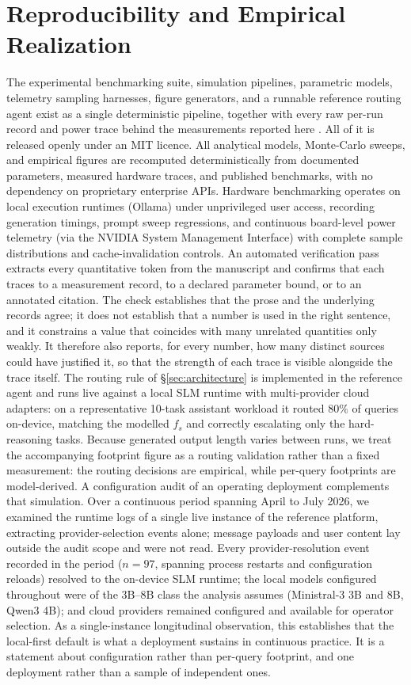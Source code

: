 \documentclass[conference]{IEEEtran}
\newcommand{\fs}{f_{s}}
\begin{document}
\section*{Reproducibility and Empirical Realization}
The experimental benchmarking suite, simulation pipelines, parametric models,
telemetry sampling harnesses, figure generators, and a runnable reference
routing agent exist as a single deterministic pipeline, together with every
raw per-run record and power trace behind the measurements reported here
\cite{autoyou2026measure}. All of it is released openly under an MIT
licence. All analytical models, Monte-Carlo sweeps,
and empirical figures are recomputed deterministically from documented
parameters, measured hardware traces, and published benchmarks, with no
dependency on proprietary enterprise APIs.
Hardware benchmarking operates on local execution runtimes (Ollama) under
unprivileged user access, recording generation timings, prompt sweep regressions,
and continuous board-level power telemetry (via the NVIDIA System Management
Interface) with complete sample distributions and cache-invalidation controls.
An automated verification pass extracts every quantitative token from the
manuscript and confirms that each traces to a measurement record, to a declared
parameter bound, or to an annotated citation. The check establishes that the
prose and the underlying records agree; it does not establish that a number is
used in the right sentence, and it constrains a value that coincides with many
unrelated quantities only weakly. It therefore also reports, for every number,
how many distinct sources could have justified it, so that the strength of each
trace is visible alongside the trace itself.
The routing rule of \S\ref{sec:architecture} is implemented in the
reference agent and runs live against a local SLM runtime with multi-provider
cloud adapters: on a representative 10-task assistant workload it routed $80\%$
of queries on-device, matching the modelled $\fs$ and correctly escalating only
the hard-reasoning tasks. Because generated output length varies between runs,
we treat the accompanying footprint figure as a routing validation rather than
a fixed measurement: the routing decisions are empirical, while per-query
footprints are model-derived.
A configuration audit of an operating deployment complements that simulation.
Over a continuous period spanning April to July 2026, we examined the runtime
logs of a single live instance of the reference platform, extracting
provider-selection events alone; message payloads and user content lay outside
the audit scope and were not read. Every provider-resolution event recorded in
the period ($n=97$, spanning process restarts and configuration reloads)
resolved to the on-device SLM runtime; the local models configured throughout
were of the 3B--8B class the analysis assumes (Ministral-3 3B and 8B, Qwen3
4B); and cloud providers remained configured and available for operator
selection. As a single-instance longitudinal observation, this establishes that
the local-first default is what a deployment sustains in continuous practice.
It is a statement about configuration rather than per-query footprint, and one
deployment rather than a sample of independent ones.
\end{document}
